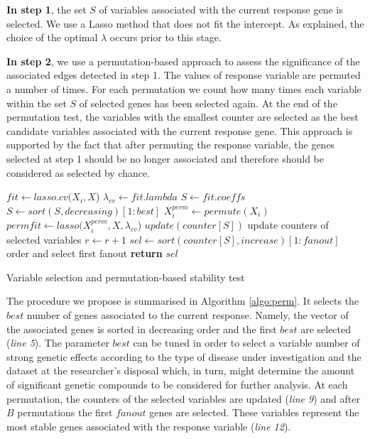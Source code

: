 \textbf{In step 1}, the set $S$ of variables associated with the current response gene is selected. We use a Lasso method that does not fit the intercept. As explained, the choice of the optimal $\lambda$ occurs prior to this stage.

\textbf{In step 2}, we use a permutation-based approach to assess the significance of the associated edges detected in step 1. The values of response variable are permuted a number of times. For each permutation we count how many times each variable within the set $S$ of selected genes has been selected again. At the end of the permutation test, the variables with the smallest counter are selected as the best candidate variables associated with the current response gene. 
This approach is supported by the fact that after permuting the response variable, the genes selected at step 1 should be no longer associated and therefore should be considered as selected by chance. 

\begin{algorithm}
 \begin{algorithmic}[1]
 \State $fit \gets lasso.cv(X_i,X$)
 \State $\lambda_{cv} \gets fit.lambda$
 \State $S \gets fit.coeffs$
 \State $S \gets sort(S, decreasing)[1:best] $ 
 \State $X^{perm}_i \gets permute(X_i)$
 \State $permfit \gets lasso(X^{perm}_i, X, \lambda_{cv}$)
 \State $update(counter[S])$  update counters of selected variables 
 \State $r\gets r+1$
 \EndWhile
 \State $sel\gets sort(counter[S], increase)[1:fanout] $ order and select first fanout
 \State \textbf{return} $sel$ 
 \EndProcedure
 \end{algorithmic}
 \caption{Variable selection and permutation-based stability test}
 \label{algo:perm}
\end{algorithm}

The procedure we propose is summarised in Algorithm \ref{algo:perm}. 
It selects the $best$ number of genes associated to the current response. Namely, the vector of the associated genes is sorted in decreasing order and the first $best$ are selected (\emph{line 5}). The parameter $best$ can be tuned in order to select a variable number of strong genetic effects according to the type of disease under investigation and the dataset at the researcher's disposal which, in turn, might determine the amount of significant genetic compounds to be considered for further analysis.   
At each permutation, the counters of the selected variables are updated (\emph{line 9}) and after $B$ permutations the first $fanout$ genes are selected. These variables represent the most stable genes associated with the response variable (\emph{line 12}).

